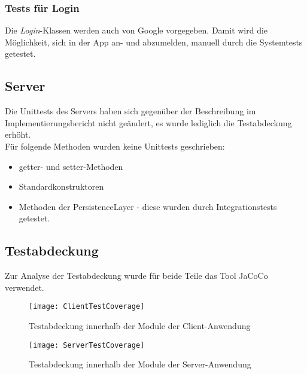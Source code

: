 \documentclass[11pt,a4paper]{scrartcl}
\begin{document}
\subsubsection{Tests für Login}
Die \textit{Login}-Klassen werden auch von Google vorgegeben. Damit wird die Möglichkeit, sich in der App an- und abzumelden, manuell durch die Systemtests getestet.

\newpage

\subsection{Server}

Die Unittests des Servers haben sich gegenüber der Beschreibung im Implementierungsbericht nicht geändert, es wurde lediglich die Testabdeckung erhöht.\\

Für folgende Methoden wurden keine Unittests geschrieben:
\begin{itemize}
	\item getter- und setter-Methoden
	\item Standardkonstruktoren
	\item Methoden der PersistenceLayer - diese wurden durch Integrationstests getestet.
\end{itemize}

\subsection{Testabdeckung}

Zur Analyse der Testabdeckung wurde für beide Teile das Tool JaCoCo verwendet.

\begin{center}
	\begin{figure}[H]
		\texttt{[image: ClientTestCoverage]}
		\caption{Testabdeckung innerhalb der Module der Client-Anwendung}
	\end{figure}
	
\end{center}

\begin{center}
	\begin{figure}[H]
		\texttt{[image: ServerTestCoverage]}
		\caption{Testabdeckung innerhalb der Module der Server-Anwendung}
	\end{figure}
	
\end{center}

\newpage
\end{document}
